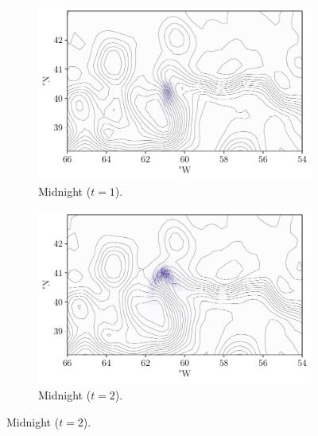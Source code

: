 \begin{figure}
	\centering
	\begin{subfigure}{0.49\textwidth}
		\includegraphics[width=\textwidth]{chp06_applications/figures/gulf_stream/rels_ssh_1.0}
		\caption{Midnight  (\(t = 1\)).}
		\label{fig:na_hist_t3_1}
	\end{subfigure}
	\begin{subfigure}{0.49\textwidth}
		\includegraphics[width=\textwidth]{chp06_applications/figures/gulf_stream/rels_ssh_2.0}
		\caption{Midnight  (\(t = 2\)).}
		\label{fig:na_hist_t3_2}
	\end{subfigure}

\end{figure}
